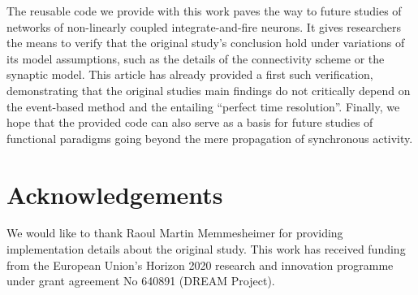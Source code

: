 \documentclass[10pt,a4paper,onecolumn]{article}
\begin{document}
The reusable code we provide with this work paves the way to future studies of networks of non-linearly coupled integrate-and-fire neurons. It gives researchers the means to verify that the original study's conclusion hold under variations of its model assumptions, such as the details of the connectivity scheme or the synaptic model. This article has already provided a first such verification, demonstrating that the original studies main findings do not critically depend on the event-based method and the entailing ``perfect time resolution''. Finally, we hope that the provided code can also serve as a basis for future studies of functional paradigms going beyond the mere propagation of synchronous activity.

\section*{Acknowledgements}
We would like to thank Raoul Martin Memmesheimer for providing implementation details about the original study. This work has received funding from the European Union’s Horizon 2020 research and innovation programme under grant agreement No 640891 (DREAM Project).
\end{document}
